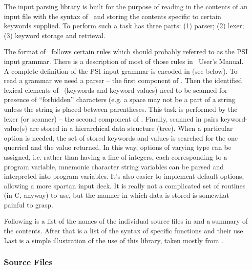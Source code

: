 %
%
%
%
%
The input parsing library is built for the purpose of reading in the 
contents of an input file with the syntax of \ and storing the
contents specific to certain keywords supplied. To perform such a task
 has three parts: (1) parser; (2) lexer; (3) keyword storage
and retrieval.

The format of \ follows certain rules which should probably referred
to as the PSI input grammar. There is a description of most of those rules in
\PSIthree\ User's Manual. A complete definition of the PSI input grammar is encoded
in  (see below).
To read a grammar we need a parser -- the first
component of . Then the identified lexical elements of
\ (keywords and keyword values) need to be scanned for
presence of ``forbidden'' characters (e.g.
a space may not be a part of a string unless the string is placed between parentheses.
This task is performed by the lexer (or scanner) -- the second component of
. Finally, scanned in pairs keyword-value(s) are stored in a hierarchical
data structure (tree). When a particular option is needed, the set of
stored keywords and values is searched for
the one querried and the value returned.  In this way, options of 
varying type can be assigned, i.e. rather than having a line of 
integers, each corresponding to a program variable, mnemonic character
string variables can be parsed and interpreted into program variables.
It's also easier to implement default options, allowing a more spartan
input deck.  It is really not a complicated set of routines (in C, anyway)
to use, but the manner in which data is stored is somewhat painful to
grasp.

Following is a list of the names of the individual source files in 
and a summary of the contents.  After that is a list of the syntax of
specific functions and their use.  Last is a simple illustration of the use
of this library, taken mostly from \PSIcscf.

\subsubsection{Source Files}

